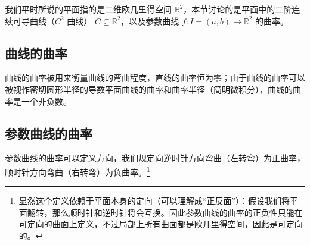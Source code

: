 
\begin{issues}
\issueDraft
\end{issues}


我们平时所说的平面指的是二维欧几里得空间 $\mathbb{R}^2$，本节讨论的是平面中的二阶连续可导曲线（$C^2$ 曲线） $C \subseteq \mathbb{R}^2$，以及参数曲线 $f: I = (a, b) \to \mathbb{R}^2$ 的曲率。

\subsection{曲线的曲率}

曲线的曲率被用来衡量曲线的弯曲程度，直线的曲率恒为零；由于曲线的曲率可以被视作密切圆形半径的导数平面曲线的曲率和曲率半径（简明微积分），曲线的曲率是一个非负数。



\subsection{参数曲线的曲率}

参数曲线的曲率可以定义方向，我们规定向逆时针方向弯曲（左转弯）为正曲率，顺时针方向弯曲（右转弯）为负曲率。\footnote{显然这个定义依赖于平面本身的定向（可以理解成“正反面”）：假设我们将平面翻转，那么顺时针和逆时针将会互换。因此参数曲线的曲率的正负性只能在可定向的曲面上定义，不过局部上所有曲面都是欧几里得空间，因此是可定向的。}


